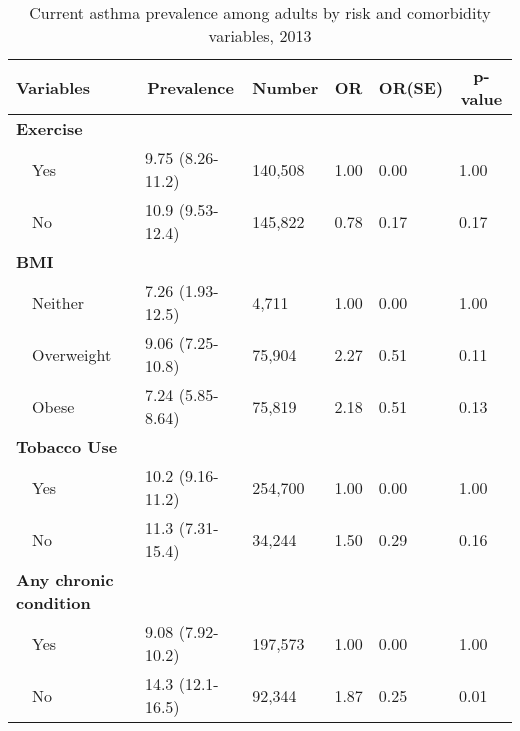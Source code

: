  
\begin{table}[H]
\caption{Current asthma prevalence  among adults by risk and comorbidity variables, 2013\label{tab:riskComo.tabl}} 
\begin{center}
\begin{tabular}{llllll}
\hline\hline
\multicolumn{1}{l}{Variables}&\multicolumn{1}{c}{Prevalence}&\multicolumn{1}{c}{Number}&\multicolumn{1}{c}{OR}&\multicolumn{1}{c}{OR(SE)}&\multicolumn{1}{c}{p-value}\tabularnewline
\hline
{\bfseries Exercise}&&&&&\tabularnewline
~~Yes&9.75 (8.26-11.2)&140,508&1.00&0.00&1.00\tabularnewline
~~No&10.9 (9.53-12.4)&145,822&0.78&0.17&0.17\tabularnewline
\hline
{\bfseries BMI}&&&&&\tabularnewline
~~Neither&7.26 (1.93-12.5)& 4,711&1.00&0.00&1.00\tabularnewline
~~Overweight&9.06 (7.25-10.8)&75,904&2.27&0.51&0.11\tabularnewline
~~Obese&7.24 (5.85-8.64)&75,819&2.18&0.51&0.13\tabularnewline
\hline
{\bfseries Tobacco Use}&&&&&\tabularnewline
~~Yes&10.2 (9.16-11.2)&254,700&1.00&0.00&1.00\tabularnewline
~~No&11.3 (7.31-15.4)& 34,244&1.50&0.29&0.16\tabularnewline
\hline
{\bfseries Any chronic condition}&&&&&\tabularnewline
~~Yes&9.08 (7.92-10.2)&197,573&1.00&0.00&1.00\tabularnewline
~~No&14.3 (12.1-16.5)& 92,344&1.87&0.25&0.01\tabularnewline
\hline
\end{tabular}\end{center}

\end{table}

 